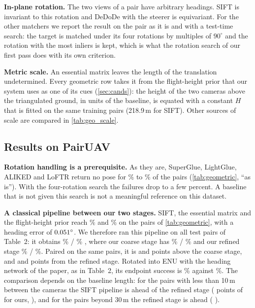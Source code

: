 \noindent\textbf{In-plane rotation.} The two views of a pair have arbitrary headings. SIFT is invariant to this rotation and DeDoDe with the steerer is equivariant. For the other matchers we report the result on the pair as it is and with a test-time search: the target is matched under its four rotations by multiples of $90^\circ$ and the rotation with the most inliers is kept, which is what the rotation search of our first pass does with its own criterion.

\noindent\textbf{Metric scale.} An essential matrix leaves the length of the translation undetermined. Every geometric row takes it from the flight-height prior that our system uses as one of its cues (\cref{sec:cands}): the height of the two cameras above the triangulated ground, in units of the baseline, is equated with a constant $H$ that is fitted on the same \gbNcal{} training pairs (218.9\,m for SIFT). Other sources of scale are compared in \cref{tab:geo_scale}.




\subsection{Results on PairUAV}
\label{sec:georesults}

\noindent\textbf{Rotation handling is a prerequisite.} As they are, SuperGlue, LightGlue, ALIKED and LoFTR return no pose for \gbPlainFailLo\% to \gbPlainFailHi\% of the pairs (\cref{tab:geometric}, ``as is''). With the four-rotation search the failures drop to a few percent. A baseline that is not given this search is not a meaningful reference on this dataset.

\noindent\textbf{A classical pipeline between our two stages.} SIFT, the essential matrix and the flight-height prior reach \gbSiftSRd\% \SRd{} and \gbSiftSRe\% \SRe{} on the pairs of \cref{tab:geometric}, with a heading error of $0.051^\circ$. We therefore ran this pipeline on all \sfNfull{} test pairs of Table~2: it obtains \sfSiftSRd\% \ci{\sfSiftSRdLo}{\sfSiftSRdHi} / \sfSiftSRe\% \ci{\sfSiftSReLo}{\sfSiftSReHi}, where our coarse stage has \sfSiSRd\% / \sfSiSRe\% and our refined stage \sfSiiSRd\% / \sfSiiSRe\%. Paired on the same pairs, it is \sfVsISRd{} \ci{\sfVsISRdLo}{\sfVsISRdHi} and \sfVsISRe{} \ci{\sfVsISReLo}{\sfVsISReHi} points above the coarse stage, and \sfVsIISRd{} \ci{\sfVsIISRdLo}{\sfVsIISRdHi} and \sfVsIISRe{} \ci{\sfVsIISReLo}{\sfVsIISReHi} points from the refined stage. Rotated into ENU with the heading network of the paper, as in Table~2, its endpoint success is \sfSiftEnuSRe\% against \sfSiiEnuSRe\%. The comparison depends on the baseline length: for the \sfShortN{} pairs with less than 10\,m between the cameras the SIFT pipeline is ahead of the refined stage (\sfShortDelta{} points of \SRe{} for ours, \ci{\sfShortDeltaLo}{\sfShortDeltaHi}), and for the \sfLongN{} pairs beyond 30\,m the refined stage is ahead (\sfLongDelta{} \ci{\sfLongDeltaLo}{\sfLongDeltaHi}).


